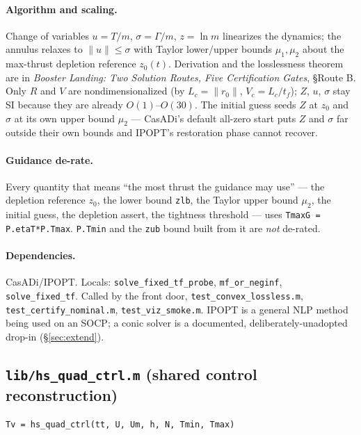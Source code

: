 \documentclass[11pt]{article}
\newcommand{\thenote}{\emph{Booster Landing: Two Solution Routes, Five
Certification Gates}}
\newcommand{\noteS}[1]{\thenote, \S#1}
\newcommand{\file}[1]{\texttt{#1}}
\begin{document}
\paragraph{Algorithm and scaling.} Change of variables $u = T/m$,
$\sigma = \Gamma/m$, $z = \ln m$ linearizes the dynamics; the annulus
relaxes to $\lVert u\rVert \le \sigma$ with Taylor lower/upper bounds
$\mu_1,\mu_2$ about the max-thrust depletion reference $z_0(t)$. Derivation
and the losslessness theorem are in \noteS{Route B}. Only $R$ and $V$ are
nondimensionalized (by $L_c = \lVert r_0\rVert$, $V_c = L_c/t_f$); $Z$, $u$,
$\sigma$ stay SI because they are already $O(1)$--$O(30)$. The initial guess
seeds $Z$ at $z_0$ and $\sigma$ at its own upper bound $\mu_2$ --- CasADi's
default all-zero start puts $Z$ and $\sigma$ far outside their own bounds
and IPOPT's restoration phase cannot recover.

\paragraph{Guidance de-rate.} Every quantity that means ``the most thrust
the guidance may use'' --- the depletion reference $z_0$, the lower bound
\texttt{zlb}, the Taylor upper bound $\mu_2$, the initial guess, the
depletion assert, the tightness threshold --- uses
\texttt{TmaxG = P.etaT*P.Tmax}. \texttt{P.Tmin} and the \texttt{zub} bound
built from it are \emph{not} de-rated.

\paragraph{Dependencies.} CasADi/IPOPT. Locals:
\texttt{solve\_fixed\_tf\_probe}, \texttt{mf\_or\_neginf},
\texttt{solve\_fixed\_tf}. Called by the front door,
\file{test\_convex\_lossless.m}, \file{test\_certify\_nominal.m},
\file{test\_viz\_smoke.m}. IPOPT is a general NLP method being used on an
SOCP; a conic solver is a documented, deliberately-unadopted drop-in
(\S\ref{sec:extend}).

\subsection{\texttt{lib/hs\_quad\_ctrl.m} (shared control reconstruction)}
\label{sec:mod:hs}

\begin{verbatim}
Tv = hs_quad_ctrl(tt, U, Um, h, N, Tmin, Tmax)
\end{verbatim}
\end{document}
